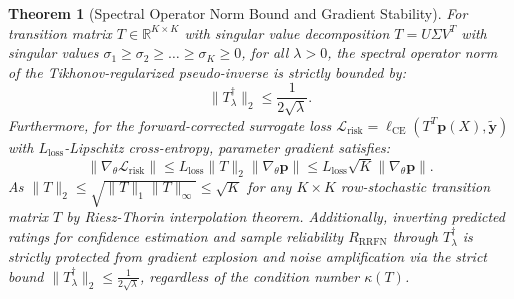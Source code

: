 \documentclass[10pt,journal]{IEEEtran}
\newtheorem{theorem}{Theorem}
\begin{document}
\begin{theorem}[Spectral Operator Norm Bound and Gradient Stability]
\label{thm:bound}
For transition matrix $T \in \mathbb{R}^{K \times K}$ with singular value decomposition $T = U \Sigma V^T$ with singular values $\sigma_1 \ge \sigma_2 \ge \dots \ge \sigma_K \ge 0$, for all $\lambda > 0$, the spectral operator norm of the Tikhonov-regularized pseudo-inverse is strictly bounded by:
\begin{equation}
    \|T^{\dagger}_{\lambda}\|_2 \le \frac{1}{2\sqrt{\lambda}}.
\end{equation}
Furthermore, for the forward-corrected surrogate loss $\mathcal{L}_{\mathrm{risk}} = \ell_{\mathrm{CE}}(T^T \mathbf{p}(X), \tilde{\mathbf{y}})$ with $L_{\mathrm{loss}}$-Lipschitz cross-entropy, parameter gradient satisfies:
\begin{equation}
    \|\nabla_\theta \mathcal{L}_{\mathrm{risk}}\| \le L_{\mathrm{loss}} \|T\|_2 \|\nabla_\theta \mathbf{p}\| \le L_{\mathrm{loss}} \sqrt{K} \|\nabla_\theta \mathbf{p}\|.
\end{equation}
As $\|T\|_2 \le \sqrt{\|T\|_1 \|T\|_\infty} \le \sqrt{K}$ for any $K \times K$ row-stochastic transition matrix $T$ by Riesz-Thorin interpolation theorem. Additionally, inverting predicted ratings for confidence estimation and sample reliability $R_{\text{RRFN}}$ through $T^{\dagger}_{\lambda}$ is strictly protected from gradient explosion and noise amplification via the strict bound $\|T^{\dagger}_{\lambda}\|_2 \le \frac{1}{2\sqrt{\lambda}}$, regardless of the condition number $\kappa(T)$.
\end{theorem}
\end{document}
